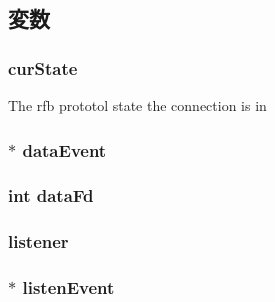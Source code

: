 \subsection{変数}
\hypertarget{classVncServer_ad0bc1d6a87b76d47489ca919f3ae51ca}{
\subsubsection[{curState}]{ {\bf curState}}}
\label{classVncServer_ad0bc1d6a87b76d47489ca919f3ae51ca}
The rfb prototol state the connection is in \hypertarget{classVncServer_a7a8501aba170bc353fe057e372612b93}{
\subsubsection[{dataEvent}]{$\ast$ {\bf dataEvent}}}
\label{classVncServer_a7a8501aba170bc353fe057e372612b93}
\hypertarget{classVncServer_ab9f945d843e004fbbb155b7709051470}{
\subsubsection[{dataFd}]{\setlength{\rightskip}{0pt plus 5cm}int {\bf dataFd}}}
\label{classVncServer_ab9f945d843e004fbbb155b7709051470}
\hypertarget{classVncServer_acf9ea448b26a541b4a197f1ca92f700b}{
\subsubsection[{listener}]{ {\bf listener}}}
\label{classVncServer_acf9ea448b26a541b4a197f1ca92f700b}
\hypertarget{classVncServer_ad7f258b1b869b6152bc5040c38b79d39}{
\subsubsection[{listenEvent}]{$\ast$ {\bf listenEvent}}}
